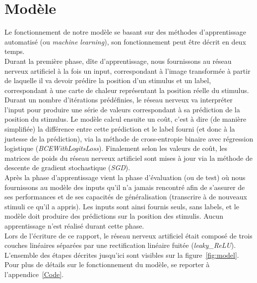 \section{Modèle}
Le fonctionnement de notre modèle se basant sur des méthodes d'apprentissage automatisé (ou \textit{machine learning}), son fonctionnement peut être décrit en deux temps.\\
Durant la première phase, dîte d'apprentissage, nous fournissons au réseau nerveux artificiel à la fois un input, correspondant à l'image transformée à partir de laquelle il va devoir prédire la position d'un stimulus et un label, correspondant à une carte de chaleur représentant la position réelle du stimulus. 
Durant un nombre d'itérations prédéfinies, le réseau nerveux va interpréter l'input pour produire une série de valeurs correspondant à sa prédiction de la position du stimulus.
Le modèle calcul ensuite un coût, c'est à dire (de manière simplifiée) la différence entre cette prédiction et le label fourni (et donc à la justesse de la prédiction), via la méthode de cross-entropie binaire avec régression logistique (\textit{BCEWithLogitsLoss}).
Finalement selon les valeurs de coût, les matrices de poids du réseau nerveux artificiel sont mises à jour via la méthode de descente de gradient stochastique (\textit{SGD}). \\
Après la phase d'apprentissage vient la phase d'évaluation (ou de test) où nous fournissons au modèle des inputs qu'il n'a jamais rencontré afin de s'assurer de ses performances et de ses capacités de généralisation (transcrire à de nouveaux stimuli ce qu'il a appris).
Les inputs sont ainsi fournis seuls, sans labels, et le modèle doit produire des prédictions sur la position des stimulis.
Aucun apprentissage n'est réalisé durant cette phase. \\
Lors de l'écriture de ce rapport, le réseau nerveux artificiel était composé de trois couches linéaires séparées par une rectification linéaire fuitée (\textit{leaky\_ReLU}). \\
L'ensemble des étapes décrites jusqu'ici sont visibles sur la figure~\ref{fig:model}.
Pour plus de détails sur le fonctionnement du modèle, se reporter à l'appendice~\ref{Code}.